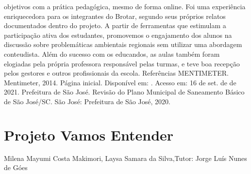 objetivos com a prática pedagógica, mesmo de forma online. Foi uma experiência
enriquecedora para os integrantes do Brotar, segundo seus próprios relatos documentados
dentro do projeto. A partir de ferramentas que estimulam a participação ativa dos estudantes,
promovemos o engajamento dos alunos na discussão sobre problemáticas ambientais
regionais sem utilizar uma abordagem conteudista. Além do sucesso com os educandos, as
aulas também foram elogiadas pela própria professora responsável pelas turmas, e teve boa
recepção pelos gestores e outros profissionais da escola.
Referências
MENTIMETER. Mentimeter, 2014. Página inicial. Disponível em:
. Acesso em: 16 de set. de de 2021.
Prefeitura de São José. Revisão do Plano Municipal de Saneamento Básico de São
José/SC. São José: Prefeitura de São José, 2020.



\section{Projeto Vamos Entender}

Milena Mayumi Costa Makimori, Laysa Samara da Silva,Tutor: Jorge Luís Nunes de Góes

